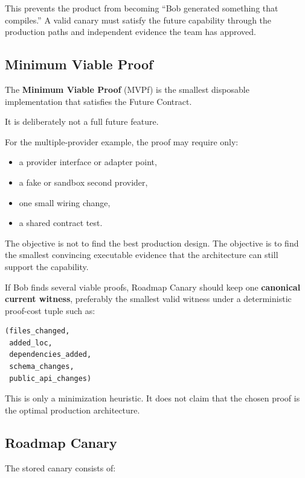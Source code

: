 \documentclass[12pt]{article}
\begin{document}
This prevents the product from becoming ``Bob generated something that compiles.'' A valid canary must satisfy the future capability through the production paths and independent evidence the team has approved.

\subsection{Minimum Viable Proof}

The \textbf{Minimum Viable Proof} (MVPf) is the smallest disposable implementation that satisfies the Future Contract.

It is deliberately not a full future feature.

For the multiple-provider example, the proof may require only:

\begin{itemize}
    \item a provider interface or adapter point,
    \item a fake or sandbox second provider,
    \item one small wiring change,
    \item a shared contract test.
\end{itemize}

The objective is not to find the best production design. The objective is to find the smallest convincing executable evidence that the architecture can still support the capability.

If Bob finds several viable proofs, Roadmap Canary should keep one \textbf{canonical current witness}, preferably the smallest valid witness under a deterministic proof-cost tuple such as:

\begin{lstlisting}
(files_changed,
 added_loc,
 dependencies_added,
 schema_changes,
 public_api_changes)
\end{lstlisting}

This is only a minimization heuristic. It does not claim that the chosen proof is the optimal production architecture.

\subsection{Roadmap Canary}

The stored canary consists of:
\end{document}
